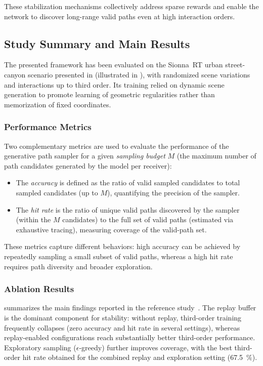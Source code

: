 These stabilization mechanisms collectively address sparse rewards and enable the network to discover long-range valid paths even at high interaction orders.

\subsection{Study Summary and Main Results}

The presented framework has been evaluated on the Sionna~RT urban street-canyon scenario presented in  (illustrated in ), with randomized scene variations and interactions up to third order. Its training relied on dynamic scene generation to promote learning of geometric regularities rather than memorization of fixed coordinates.

\subsubsection{Performance Metrics}

Two complementary metrics are used to evaluate the performance of the generative path sampler for a given \emph{sampling budget} $M$ (the maximum number of path candidates generated by the model per receiver):
\begin{itemize}
  \item The \emph{accuracy} is defined as the ratio of valid sampled candidates to total sampled candidates (up to $M$), quantifying the precision of the sampler.
  \item The \emph{hit rate} is the ratio of unique valid paths discovered by the sampler (within the $M$ candidates) to the full set of valid paths (estimated via exhaustive tracing), measuring coverage of the valid-path set.
\end{itemize}

These metrics capture different behaviors: high accuracy can be achieved by repeatedly sampling a small subset of valid paths, whereas a high hit rate requires path diversity and broader exploration.

\subsubsection{Ablation Results}

 summarizes the main findings reported in the reference study~. The replay buffer is the dominant component for stability: without replay, third-order training frequently collapses (zero accuracy and hit rate in several settings), whereas replay-enabled configurations reach substantially better third-order performance. Exploratory sampling ($\epsilon$-greedy) further improves coverage, with the best third-order hit rate obtained for the combined replay and exploration setting (\qty{67.5}{\percent}).

